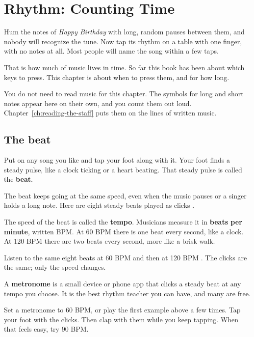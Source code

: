 \chapter{Rhythm: Counting Time}
\label{ch:beats-timing-and-reading}
\chapterline

Hum the notes of \emph{Happy Birthday} with long, random pauses between them, and nobody will recognize the tune. Now tap its rhythm on a table with one finger, with no notes at all. Most people will name the song within a few taps.

That is how much of music lives in time. So far this book has been about which keys to press. This chapter is about when to press them, and for how long.

You do not need to read music for this chapter. The symbols for long and short notes appear here on their own, and you count them out loud. Chapter~\ref{ch:reading-the-staff} puts them on the lines of written music.

\section{The beat}

Put on any song you like and tap your foot along with it. Your foot finds a steady pulse, like a clock ticking or a heart beating. That steady pulse is called the \textbf{beat}.

The beat keeps going at the same speed, even when the music pauses or a singer holds a long note. Here are eight steady beats played as clicks .

The speed of the beat is called the \textbf{tempo}. Musicians measure it in \textbf{beats per minute}, written BPM. At 60 BPM there is one beat every second, like a clock. At 120 BPM there are two beats every second, more like a brisk walk.

Listen to the same eight beats at 60 BPM  and then at 120 BPM . The clicks are the same; only the speed changes.

A \textbf{metronome} is a small device or phone app that clicks a steady beat at any tempo you choose. It is the best rhythm teacher you can have, and many are free.

\begin{tryitbox}
Set a metronome to 60 BPM, or play the first example above a few times. Tap your foot with the clicks. Then clap with them while you keep tapping. When that feels easy, try 90 BPM.
\end{tryitbox}

